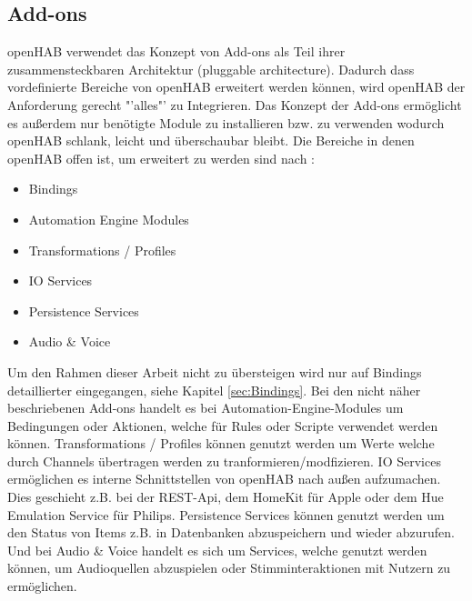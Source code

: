 \subsection{Add-ons}\label{sec:add-ons}
openHAB verwendet das Konzept von Add-ons als Teil ihrer zusammensteckbaren Architektur (pluggable architecture). Dadurch dass vordefinierte Bereiche von openHAB erweitert werden können, wird openHAB der Anforderung gerecht "'alles"' zu Integrieren. Das Konzept der Add-ons ermöglicht es außerdem nur benötigte Module zu installieren bzw. zu verwenden wodurch openHAB schlank, leicht und überschaubar bleibt. Die Bereiche in denen openHAB offen ist, um erweitert zu werden sind nach \cite{OPENHAB04:OH}:
\begin{itemize}
	\item Bindings
	\item Automation Engine Modules
	\item Transformations / Profiles
	\item IO Services
	\item Persistence Services
	\item Audio \& Voice
\end{itemize}
Um den Rahmen dieser Arbeit nicht zu übersteigen wird nur auf Bindings detaillierter eingegangen, siehe Kapitel \ref{sec:Bindings}. Bei den nicht näher beschriebenen Add-ons handelt es bei Automation-Engine-Modules um Bedingungen oder Aktionen, welche für Rules oder Scripte verwendet werden können. Transformations / Profiles können genutzt werden um Werte welche durch Channels übertragen werden zu tranformieren/modfizieren. IO Services ermöglichen es interne Schnittstellen von openHAB nach außen aufzumachen. Dies geschieht z.B. bei der REST-Api, dem HomeKit für Apple oder dem Hue Emulation Service für Philips. Persistence Services können genutzt werden um den Status von Items z.B. in Datenbanken abzuspeichern und wieder abzurufen. Und bei Audio \& Voice handelt es sich um Services, welche genutzt werden können, um Audioquellen abzuspielen oder Stimminteraktionen mit Nutzern zu ermöglichen.

